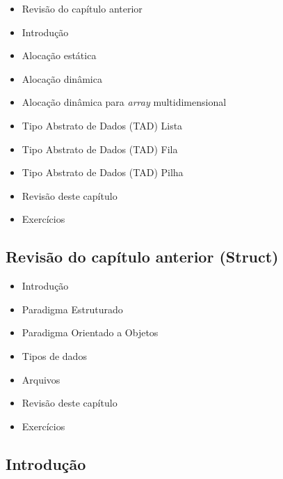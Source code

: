 \documentclass[12pt,a4paper]{article}
\providecommand{\tightlist}{%
      \setlength{\itemsep}{0pt}\setlength{\parskip}{0pt}}
\begin{document}
\begin{itemize}
\tightlist
\item
  Revisão do capítulo anterior
\item
  Introdução
\item
  Alocação estática
\item
  Alocação dinâmica
\item
  Alocação dinâmica para \emph{array} multidimensional
\item
  Tipo Abstrato de Dados (TAD) Lista
\item
  Tipo Abstrato de Dados (TAD) Fila
\item
  Tipo Abstrato de Dados (TAD) Pilha
\item
  Revisão deste capítulo
\item
  Exercícios
\end{itemize}

    \hypertarget{revisuxe3o-do-capuxedtulo-anterior-struct}{%
\subsection{Revisão do capítulo anterior
(Struct)}\label{revisuxe3o-do-capuxedtulo-anterior-struct}}

    \begin{itemize}
\tightlist
\item
  Introdução
\item
  Paradigma Estruturado
\item
  Paradigma Orientado a Objetos
\item
  Tipos de dados
\item
  Arquivos
\item
  Revisão deste capítulo
\item
  Exercícios
\end{itemize}

    \hypertarget{introduuxe7uxe3o}{%
\subsection{Introdução}\label{introduuxe7uxe3o}}
\end{document}
